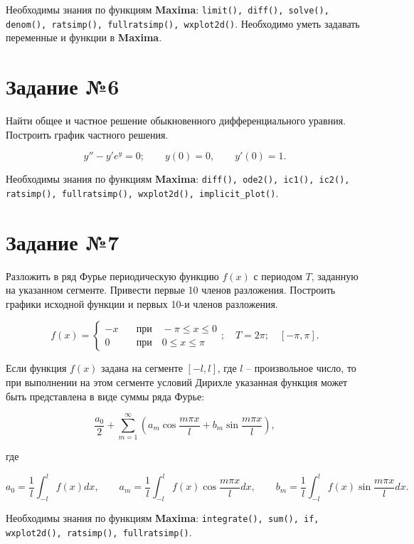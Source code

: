     Необходимы знания по функциям \textbf{Maxima}: {\tt limit(), diff(), solve(), denom(), ratsimp(), fullratsimp(), wxplot2d()}. Необходимо уметь задавать переменные и функции в \textbf{Maxima}.

    \section*{Задание №6}
    
    Найти общее и частное решение обыкновенного дифференциального уравния. Построить график частного решения.

    \[
        y'' - y' e^{y} = 0; \qquad y(0) = 0, \qquad y'(0) = 1.
    \]

    Необходимы знания по функциям \textbf{Maxima}: {\tt diff(), ode2(), ic1(), ic2(), ratsimp(), fullratsimp(), wxplot2d(), implicit\_plot()}.

    \section*{Задание №7}
    
    Разложить в ряд Фурье периодическую функцию $f(x)$ с периодом $T$, заданную на указанном сегменте. Привести первые 10 членов разложения. Построить графики исходной функции и первых 10-и членов разложения.

    \[
        f(x) =
            \begin{cases}
                - x \quad &\mbox{при} \quad -\pi \leq x \leq 0\\
                0 \quad &\mbox{при} \quad 0 \leq x \leq \pi
            \end{cases}; \quad T = 2 \pi; \quad [-\pi, \pi].
    \]

    Если функция $f(x)$ задана на сегменте $[-l,l]$, где $l$ -- произвольное число, то при выполнении на этом сегменте условий Дирихле указанная функция может быть представлена в виде суммы ряда Фурье:

    \[
        \frac{a_{0}}{2} + \sum_{m = 1}^{\infty} \left( a_{m} \cos \frac{m \pi x}{l} + b_{m} \sin \frac{m \pi x}{l} \right),
    \]

    где

    \[
        a_{0} =  \frac{1}{l} \int_{-l}^{l} f(x) dx, \qquad a_{m} = \frac{1}{l} \int_{-l}^{l} f(x) \cos \frac{m \pi x}{l} dx, \qquad b_{m} = \frac{1}{l} \int_{-l}^{l} f(x) \sin \frac{m \pi x}{l} dx.
    \]
    
    Необходимы знания по функциям \textbf{Maxima}: {\tt integrate(), sum(), if, wxplot2d(), ratsimp(), fullratsimp()}.

